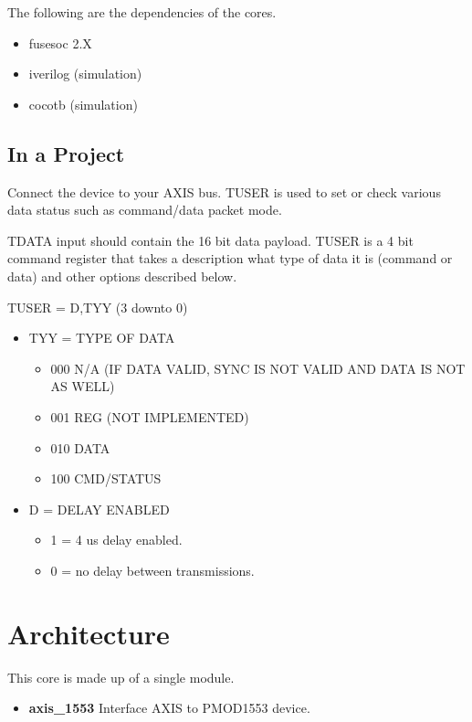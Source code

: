 \par
The following are the dependencies of the cores.

\begin{itemize}
  \item fusesoc 2.X
  \item iverilog (simulation)
  \item cocotb (simulation)
\end{itemize}



\subsection{In a Project}
\par
Connect the device to your AXIS bus. TUSER is used to set or check various data status such as command/data packet mode.

\par
TDATA input should contain the 16 bit data payload. TUSER is a 4 bit command register
that takes a description what type of data it is (command or data) and other options
described below.

TUSER = {D,TYY} (3 downto 0)
\begin{itemize}
\item TYY = TYPE OF DATA
  \begin{itemize}
    \item 000 N/A (IF DATA VALID, SYNC IS NOT VALID AND DATA IS NOT AS WELL)
    \item 001 REG (NOT IMPLEMENTED)
    \item 010 DATA
    \item 100 CMD/STATUS
  \end{itemize}
  \item D = DELAY ENABLED
  \begin{itemize}
    \item 1 = 4 us delay enabled.
    \item 0 = no delay between transmissions.
  \end{itemize}
\end{itemize}

\section{Architecture}
\par
This core is made up of a single module.
\begin{itemize}
  \item \textbf{axis\_1553} Interface AXIS to PMOD1553 device.
\end{itemize}

